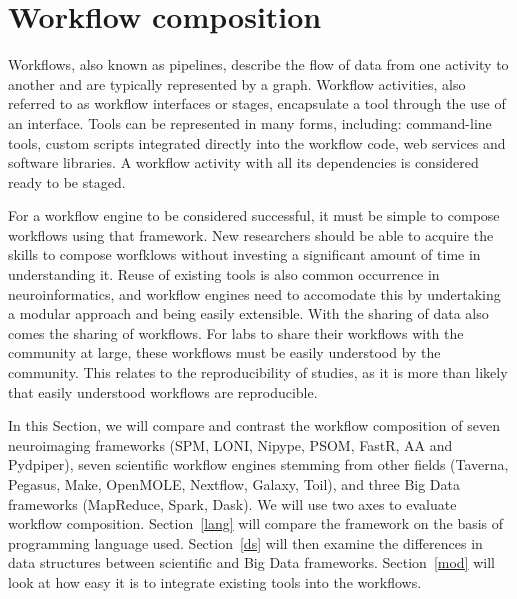     \section{Workflow composition}\label{workcomp}

        Workflows, also known as pipelines, describe the flow of data from one
        activity to another and are typically represented by a graph. Workflow
        activities, also referred to as workflow interfaces or stages,
        encapsulate a tool through the use of an interface. Tools can be
        represented in many forms, including: command-line tools, custom scripts
        integrated directly into the workflow code, web services and software
        libraries. A workflow activity with all its dependencies is considered
        ready to be staged.

        For a workflow engine to be considered successful, it must be simple to
        compose workflows using that framework. New researchers should be able
        to acquire the skills to compose worfklows without investing a
        significant amount of time in understanding it. Reuse of existing tools
        is also common occurrence in neuroinformatics, and workflow engines need
        to accomodate this by undertaking a modular approach and being easily
        extensible. With the sharing of data also comes the sharing of
        workflows. For labs to share their workflows with the community at
        large, these workflows must be easily understood by the community. This
        relates to the reproducibility of studies, as it is more than likely
        that easily understood workflows are reproducible. 

        In this Section, we will compare and contrast the workflow composition
        of seven neuroimaging frameworks (SPM, LONI, Nipype, PSOM, FastR, AA and
        Pydpiper), seven scientific workflow engines stemming from other fields
        (Taverna, Pegasus, Make, OpenMOLE, Nextflow, Galaxy, Toil), and three
        Big Data frameworks (MapReduce, Spark, Dask). We will use two axes to
        evaluate workflow composition. Section~\ref{lang} will compare the
        framework on the basis of programming language used. Section~\ref{ds}
        will then examine the differences in data structures between scientific
        and Big Data frameworks. Section~\ref{mod} will look at how easy it is
        to integrate existing tools into the workflows.

